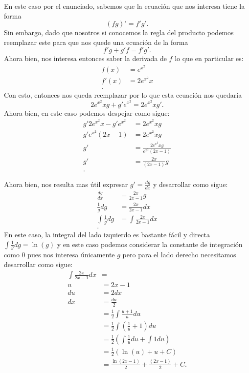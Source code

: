 \begin{enumerate}
	En este caso por el enunciado, sabemos que la ecuación que nos interesa tiene la forma \[
	\left( fg \right)' = f'g'
	.\] Sin embargo, dado que nosotros si conocemos la regla del producto podemos reemplazar este para que nos quede una ecuación de la forma \[
	f'g + g'f = f'g'
	.\] Ahora bien, nos interesa entonces saber la derivada de $f$ lo que en particular es:
	\begin{align*}
	  f\left( x \right) &= e^{x^{2}}\\
	  f'\left( x \right) &= 2e^{x^{2}}x \\
	.\end{align*}
	Con esto, entonces nos queda reemplazar por lo que esta ecuación nos quedaría \[
	2e^{x^{2}}x g + g'e^{x^{2}} = 2e^{x^{2}}xg'
	.\] Ahora bien, en este caso podemos despejar como sigue:
	\begin{align*}
	  g'2e^{x^{2}}x - g'e^{x^{2}} &= 2e^{x^{2}}xg\\
	  g'e^{x^{2}}\left( 2x - 1 \right) &= 2e^{x^{2}}xg \\
	  g'&= \frac{2e^{x^{2}}xg}{e^{x^{2}}\left( 2x - 1 \right) } \\
	  g'&= \frac{2x}{\left( 2x - 1 \right) } g \\
	.\end{align*}

	Ahora bien, nos resulta mas útil expresar $g' = \frac{dg}{dx}$ y desarrollar como sigue:
	\begin{align*}
	  \frac{dg}{dx}&= \frac{2x}{2x-1}g \\
	  \frac{1}{g}dg &= \frac{2x}{2x - 1}dx \\
	  \int \frac{1}{g}dg &= \int \frac{2x}{2x - 1}dx \\
	.\end{align*}
	En este caso, la integral del lado izquierdo es bastante fácil y directa $\int \frac{1}{g}dg = \ln\left( g \right) $ y en este caso podemos considerar la constante de integración como $0$ pues nos interesa únicamente  $g$ pero para el lado derecho necesitamos desarrollar como sigue:
	\begin{align*}
	  \int \frac{2x}{2x-1}dx &=  \\
	  u &= 2x-1 \\
	  du &= 2 dx \\
	  dx &= \frac{du}{2} \\
	  &= \frac{1}{2}\int \frac{u + 1}{u}du \\
	  &= \frac{1}{2}\int\left( \frac{1}{u} + 1 \right) du \\
	  &= \frac{1}{2}\left(\int \frac{1}{u}du + \int 1 du\right)\\
	  &= \frac{1}{2}\left( \ln\left( u \right) + u + C \right)  \\
	  &= \frac{\ln\left( 2x - 1 \right) }{2} + \frac{\left( 2x - 1 \right) }{2} + C
	.\end{align*}


\end{enumerate}

